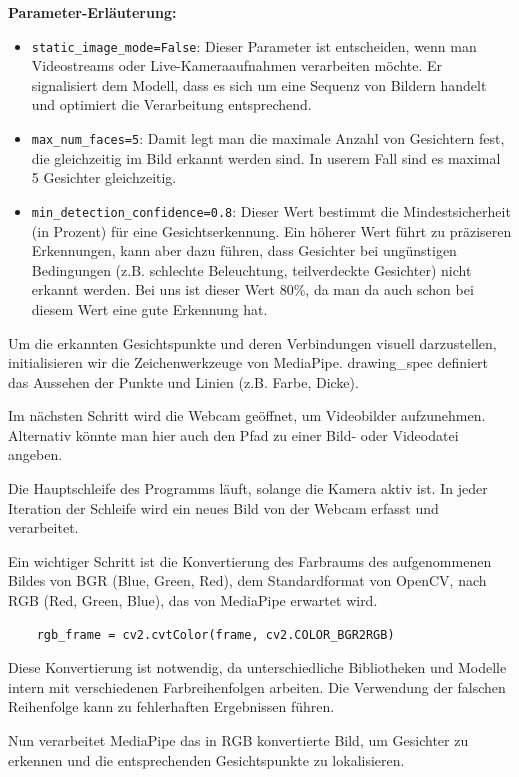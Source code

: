 \textbf{Parameter-Erläuterung:}
\begin{itemize}
    \item \texttt{static\_image\_mode=False}: Dieser Parameter ist entscheiden, wenn man Videostreams oder Live-Kameraaufnahmen verarbeiten möchte. Er signalisiert dem Modell, dass es sich um eine Sequenz von Bildern handelt und optimiert die Verarbeitung entsprechend.
    \item \texttt{max\_num\_faces=5}: Damit legt man die maximale Anzahl von Gesichtern fest, die gleichzeitig im Bild erkannt werden sind. In userem Fall sind es maximal 5 Gesichter gleichzeitig.
    \item \texttt{min\_detection\_confidence=0.8}: Dieser Wert bestimmt die Mindestsicherheit (in Prozent) für eine Gesichtserkennung. Ein höherer Wert führt zu präziseren Erkennungen, kann aber dazu führen, dass Gesichter bei ungünstigen Bedingungen (z.B. schlechte Beleuchtung, teilverdeckte Gesichter) nicht erkannt werden. Bei uns ist dieser Wert 80\%, da man da auch schon bei diesem Wert eine gute Erkennung hat.
\end{itemize}

Um die erkannten Gesichtspunkte und deren Verbindungen visuell darzustellen, initialisieren wir die Zeichenwerkzeuge von MediaPipe. drawing\_spec definiert das Aussehen der Punkte und Linien (z.B. Farbe, Dicke).

Im nächsten Schritt wird die Webcam geöffnet, um Videobilder aufzunehmen. Alternativ könnte man hier auch den Pfad zu einer Bild- oder Videodatei angeben. 

Die Hauptschleife des Programms läuft, solange die Kamera aktiv ist. In jeder Iteration der Schleife wird ein neues Bild von der Webcam erfasst und verarbeitet.

Ein wichtiger Schritt ist die Konvertierung des Farbraums des aufgenommenen Bildes von BGR (Blue, Green, Red), dem Standardformat von OpenCV, nach RGB (Red, Green, Blue), das von MediaPipe erwartet wird.
\begin{lstlisting}
    rgb_frame = cv2.cvtColor(frame, cv2.COLOR_BGR2RGB)
\end{lstlisting}
Diese Konvertierung ist notwendig, da unterschiedliche Bibliotheken und Modelle intern mit verschiedenen Farbreihenfolgen arbeiten. Die Verwendung der falschen Reihenfolge kann zu fehlerhaften Ergebnissen führen.

Nun verarbeitet MediaPipe das in RGB konvertierte Bild, um Gesichter zu erkennen und die entsprechenden Gesichtspunkte zu lokalisieren.
 
